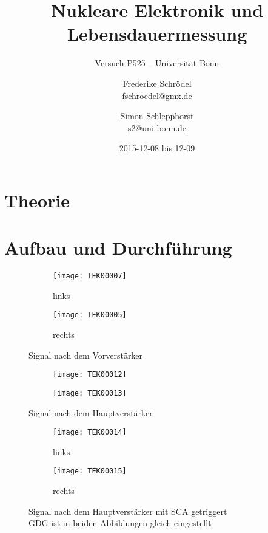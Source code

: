 \documentclass[11pt, ngerman, fleqn, DIV=15, headinclude, BCOR=2cm]{scrreprt}
\title{Nukleare Elektronik und Lebensdauermessung}
\subtitle{Versuch P525 -- Universität Bonn}
\author{
	Frederike Schrödel \\
	\small{\href{mailto:fschroedel@gmx.de}{fschroedel@gmx.de}}
	\and
	Simon Schlepphorst \\
	\small{\href{mailto:s2@uni-bonn.de}{s2@uni-bonn.de}}
}
\date{2015-12-08 bis 12-09}
\begin{document}
\maketitle

\begin{abstract}
\end{abstract}


\tableofcontents

\chapter{Theorie}


\chapter{Aufbau und Durchführung}


\begin{figure}
	\centering
	\begin{subfigure}{0.49 \textwidth}
		\texttt{[image: TEK00007]}
		\caption{%
			links
		}
		\label{fig:slow_signal-li}
	\end{subfigure}
	\begin{subfigure}{0.49 \textwidth}
		\texttt{[image: TEK00005]}
		\caption{%
			rechts
		}
		\label{fig:slow_signal-re}
	\end{subfigure}
	\caption{%
		Signal nach dem Vorverstärker
	}
	\label{fig:slow_signal}
\end{figure}

\begin{figure}
	\centering
	\begin{subfigure}{0.49 \textwidth}
		\texttt{[image: TEK00012]}
	\end{subfigure}
	\begin{subfigure}{0.49 \textwidth}
		\texttt{[image: TEK00013]}
	\end{subfigure}
	\caption{%
		Signal nach dem Hauptverstärker
	}
	\label{fig:slow_signal_hv}
\end{figure}

\begin{figure}
	\centering
	\begin{subfigure}{0.49 \textwidth}
		\texttt{[image: TEK00014]}
		\caption{%
			links
		}
		\label{fig:slow_signal_sca_trig-li}
	\end{subfigure}
	\begin{subfigure}{0.49 \textwidth}
		\texttt{[image: TEK00015]}
		\caption{%
			rechts
		}
		\label{fig:slow_signal_sca_trig-re}
	\end{subfigure}
	\caption{%
		Signal nach dem Hauptverstärker mit SCA getriggert\\
		GDG ist in beiden Abbildungen gleich eingestellt
	}
	\label{fig:slow_signal_sca_trig}
\end{figure}
\end{document}
